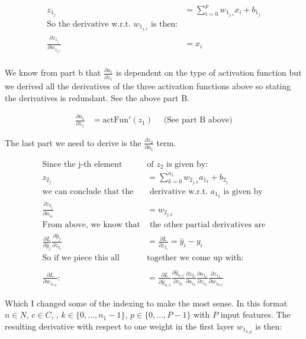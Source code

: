 \documentclass[]{article}
\begin{document}
\begin{align*}
z_{1_j} &= \sum_{i = 0}^p w_{1_{j,i}}x_i + b_{1_j} \\
\text{So the derivative w.r.t. $w_{1_{j,i}}$ is then:}\\
\frac{\partial z_{1_j} }{\partial w_{1_{j,i}}} &= x_i \\
\end{align*}

We know from part b that $\frac{\partial a_1}{\partial z_1} $ is dependent on the type of activation function but we derived all the derivatives of the three activation functions above so stating the derivatives is redundant. See the above part B. 

\begin{align*}
\frac{\partial a_1}{\partial z_1} & =  \text{actFun}'(z_1) \quad \text{ (See part B above)}
\end{align*}


The last part we need to derive is the $\frac{\partial z_2}{\partial a_1}$ term. 

\begin{align*}
\text{Since the j-th element } & \text{of $z_2$ is given by: } \\
z_{2_j} &= \sum_{k = 0}^{n_1}w_{2_{j,k}}a_{1_k} + b_{2_j}\\ 
\text{we can conclude that the}&\text{ derivative w.r.t. $a_{1_k}$ is given by }\\ 
\frac{\partial z_{2_j}}{\partial a_{1_k}} & =w_{2_{j,k}}\\
\text{From above, we know that}&\text{ the other partial derivatives are}\\
\frac{\partial L }{\partial  \hat{y}_{j} }  \frac{\partial  \hat{y}_{j} }{\partial z_{2_i}}  &=\frac{\partial L}{\partial z_{2_i}} = \hat{y}_i - y_i \\
\text{So if we piece this all } & \text{together we come up with:}\\
\\
\frac{\partial L}{\partial w_{1_{k,p}}} : &=  \frac{\partial L }{\partial  \hat{y}_{n,c} } \frac{\partial  \hat{y}_{n,c} }{\partial z_{2_c}} \frac{\partial z_{2_c}}{\partial a_{1_k}}\frac{\partial a_{1_k}}{\partial z_{1_k}} \frac{\partial z_{1_k}}{\partial w_{1_{k,p}}}  
\end{align*}

Which I changed some of the indexing to make the most sense. In this format $n \in N$, $c \in C$,   , $k \in \{0,... , n_1-1  \}$, $p \in \{0,... , P-1  \}$ with $P$ input features. The resulting derivative with respect to one weight in the first layer $w_{1_{k,p}}$ is then:
\end{document}

